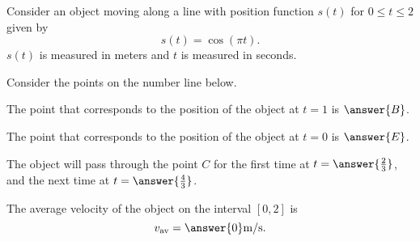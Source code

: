 \documentclass{ximera}
\author{Nela Lakos \and Kyle Parsons}
\begin{document}
\begin{exercise}

Consider an object moving along a line with position function $s(t)$ for $0\leq t\leq2$ given by
\[
s(t) = \cos(\pi t).
\]
$s(t)$ is measured in meters and $t$ is measured in seconds.

Consider the points on the number line below.

\begin{exercise}
The point that corresponds to the position of the object at $t=1$ is $\answer{B}$.\\
\begin{exercise}
The point that corresponds to the position of the object at $t=0$ is $\answer{E}$.
\begin{exercise}
The object will pass through  the point $C$ for the first time at $t=\answer{\frac{2}{3}}$, and the next time at $t=\answer{\frac{4}{3}}$.
\begin{exercise}

The average velocity of the object on the interval $[0,2]$ is
\[
v_{\text{av}} = \answer{0}\text{m/s.}
\]
\end{exercise}
\end{exercise}

\end{exercise}
\end{exercise}
\end{exercise}
\end{document}
